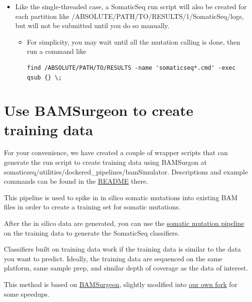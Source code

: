 \documentclass[10pt,letterpaper]{article}
\begin{document}
\begin{sloppypar}
\begin{itemize}
  \item
  Like the single-threaded case, a SomaticSeq run script will also be created for each partition like /ABSOLUTE/PATH/TO/RESULTS/1/SomaticSeq/logs, but will not be submitted until you do so manually.

      
    \begin{itemize}
    \item   
    For simplicity, you may wait until all the mutation calling is done, then run a command like 
    \begin{lstlisting}
find /ABSOLUTE/PATH/TO/RESULTS -name 'somaticseq*.cmd' -exec qsub {} \;
    \end{lstlisting}

    \end{itemize}

\end{itemize}





\section{Use BAMSurgeon to create training data}

For your convenience, we have created a couple of wrapper scripts that can generate the run script to create training data using BAMSurgon at somaticseq/utilities/dockered\_pipelines/bamSimulator. Descriptions and example commands can be found in the \href{https://github.com/bioinform/somaticseq/tree/master/utilities/dockered_pipelines/bamSimulator}{README} there. 

This pipeline is used to spike in in silico somatic mutations into existing BAM files in order to create a training set for somatic mutations.

After the in silico data are generated, you can use the \href{https://github.com/bioinform/somaticseq/blob/master/utilities/dockered_pipelines}{somatic mutation pipeline} on the training data to generate the SomaticSeq classifiers.

Classifiers built on training data work if the training data is similar to the data you want to predict. Ideally, the training data are sequenced on the same platform, same sample prep, and similar depth of coverage as the data of interest.

This method is based on \href{https://github.com/adamewing/bamsurgeon}{BAMSurgeon}, slightly modified into \href{https://github.com/ltfang-bina/bamsurgeon}{our own fork} for some speedups.


\end{sloppypar}
\end{document}
